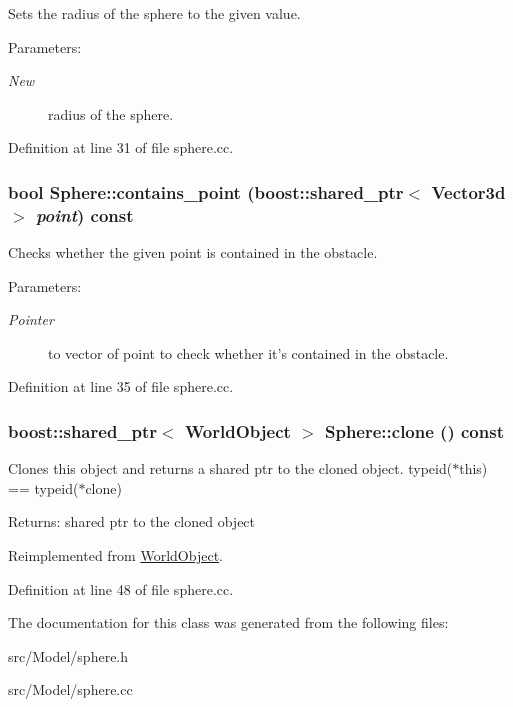 Sets the radius of the sphere to the given value. \begin{Desc}
\item[Parameters:]
\begin{description}
\item[{\em New}]radius of the sphere. \end{description}
\end{Desc}


Definition at line 31 of file sphere.cc.\hypertarget{class_sphere_f031ce505d4f21bc7d8bf1b7684280e0}{
\subsubsection[contains\_\-point]{\setlength{\rightskip}{0pt plus 5cm}bool Sphere::contains\_\-point (boost::shared\_\-ptr$<$ Vector3d $>$ {\em point}) const}}
\label{class_sphere_f031ce505d4f21bc7d8bf1b7684280e0}


Checks whether the given point is contained in the obstacle. \begin{Desc}
\item[Parameters:]
\begin{description}
\item[{\em Pointer}]to vector of point to check whether it's contained in the obstacle. \end{description}
\end{Desc}


Definition at line 35 of file sphere.cc.\hypertarget{class_sphere_6fcc846dbbef396057b572b9a0786cdc}{
\subsubsection[clone]{\setlength{\rightskip}{0pt plus 5cm}boost::shared\_\-ptr$<$ {\bf WorldObject} $>$ Sphere::clone () const}}
\label{class_sphere_6fcc846dbbef396057b572b9a0786cdc}


Clones this object and returns a shared ptr to the cloned object. typeid($\ast$this) == typeid($\ast$clone) \begin{Desc}
\item[Returns:]shared ptr to the cloned object \end{Desc}


Reimplemented from \hyperlink{class_world_object_dba468299ce77ce5781e60081bf44b14}{WorldObject}.

Definition at line 48 of file sphere.cc.

The documentation for this class was generated from the following files:\begin{CompactItemize}
\item 
src/Model/sphere.h\item 
src/Model/sphere.cc\end{CompactItemize}
